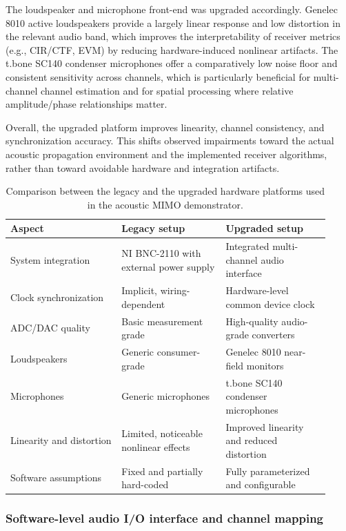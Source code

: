The loudspeaker and microphone front-end was upgraded accordingly. Genelec 8010 active loudspeakers provide a largely linear response and low distortion in the relevant audio band, which improves the interpretability of receiver metrics (e.g., CIR/CTF, EVM) by reducing hardware-induced nonlinear artifacts. The t.bone SC140 condenser microphones offer a comparatively low noise floor and consistent sensitivity across channels, which is particularly beneficial for multi-channel channel estimation and for spatial processing where relative amplitude/phase relationships matter.

Overall, the upgraded platform improves linearity, channel consistency, and synchronization accuracy. This shifts observed impairments toward the actual acoustic propagation environment and the implemented receiver algorithms, rather than toward avoidable hardware and integration artifacts.

\begin{table}[t]
\centering
\caption{Comparison between the legacy and the upgraded hardware platforms used in the acoustic MIMO demonstrator.}
\label{tab:hw_comparison}
\begin{tabular}{p{0.32\linewidth}p{0.30\linewidth}p{0.30\linewidth}}
\hline
Aspect & Legacy setup & Upgraded setup \\
\hline
System integration & NI BNC-2110 with external power supply & Integrated multi-channel audio interface \\
Clock synchronization & Implicit, wiring-dependent & Hardware-level common device clock \\
ADC/DAC quality & Basic measurement grade & High-quality audio-grade converters \\
Loudspeakers & Generic consumer-grade & Genelec 8010 near-field monitors \\
Microphones & Generic microphones & t.bone SC140 condenser microphones \\
Linearity and distortion & Limited, noticeable nonlinear effects & Improved linearity and reduced distortion \\
Software assumptions & Fixed and partially hard-coded & Fully parameterized and configurable \\
\hline
\end{tabular}
\end{table}

\subsubsection{Software-level audio I/O interface and channel mapping}
\label{sec:apr_interface}

